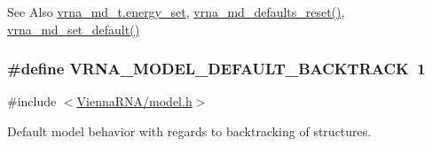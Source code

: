 \begin{DoxySeeAlso}{See Also}
\hyperlink{group__model__details_a5eee4e3b468eb690d1407e0178dafb3f}{vrna\-\_\-md\-\_\-t.\-energy\-\_\-set}, \hyperlink{group__model__details_ga70834424cf804d149937de89f80ceb45}{vrna\-\_\-md\-\_\-defaults\-\_\-reset()}, \hyperlink{group__model__details_ga8ac6ff84936282436f822644bf841f66}{vrna\-\_\-md\-\_\-set\-\_\-default()} 
\end{DoxySeeAlso}
\hypertarget{group__model__details_ga3fda8006ab84baf817bd8e5ccbc6bb35}{
\subsubsection[{V\-R\-N\-A\-\_\-\-M\-O\-D\-E\-L\-\_\-\-D\-E\-F\-A\-U\-L\-T\-\_\-\-B\-A\-C\-K\-T\-R\-A\-C\-K}]{\setlength{\rightskip}{0pt plus 5cm}\#define V\-R\-N\-A\-\_\-\-M\-O\-D\-E\-L\-\_\-\-D\-E\-F\-A\-U\-L\-T\-\_\-\-B\-A\-C\-K\-T\-R\-A\-C\-K~1}}\label{group__model__details_ga3fda8006ab84baf817bd8e5ccbc6bb35}


{\ttfamily \#include $<$\hyperlink{model_8h}{Vienna\-R\-N\-A/model.\-h}$>$}



Default model behavior with regards to backtracking of structures. 

